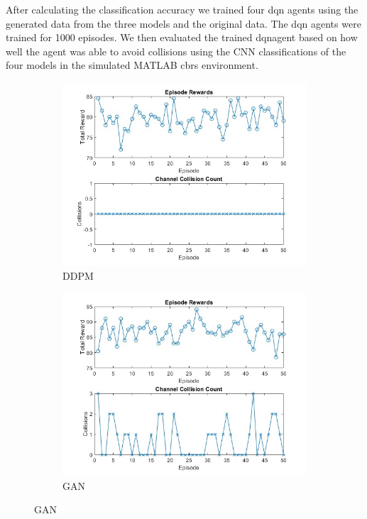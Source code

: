     After calculating the classification accuracy we trained four \gls{dqn} agents using the generated data from the three models and the original data. 
    The \gls{dqn} agents were trained for 1000 episodes. We then evaluated the trained \gls{dqn}agent based on how well the agent was able to avoid 
    collisions using the CNN classifications of the four models in the simulated MATLAB \gls{cbrs} environment.

    
\begin{figure}[htbp]
    \centering
    \begin{subfigure}[b]{0.45\textwidth}
        \centering
        \includegraphics[width=\linewidth]{figures/collision_count_ddpm.jpg}
        \caption{DDPM}
    \end{subfigure}
    \hfill
    \begin{subfigure}[b]{0.45\textwidth}
        \centering
        \includegraphics[width=\linewidth]{figures/collision_count_gan.jpg}
        \caption{GAN}
    \end{subfigure}


\end{figure}
